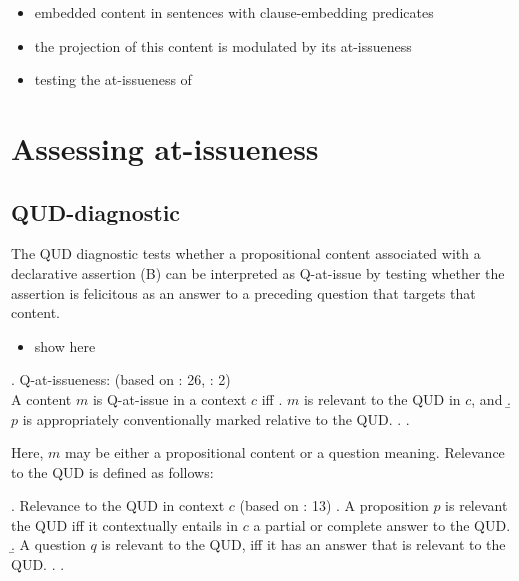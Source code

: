     \begin{itemize}
      \item embedded content in sentences with clause-embedding predicates 
      \item the projection of this content is modulated by its at-issueness
      \item testing the at-issueness of 

    \end{itemize}


   

\section{Assessing at-issueness}
  \subsection{QUD-diagnostic}
    The QUD diagnostic tests whether a propositional content associated with a declarative assertion (B) can be interpreted as Q-at-issue by testing whether the assertion is felicitous as an answer to a preceding question that targets that content.
    \begin{itemize}
      \item show here
    \end{itemize}

    \ex. \label{def:qai}%
      Q-at-issueness: \hfill (based on \citealt{simons_what_2010}: 26, \citealt{koev_notions_2018}: 2)\\
        A content $m$ is Q-at-issue in a context $c$ iff
        \a. \label{def:qai-relevant}%
          $m$ is relevant to the QUD in $c$, and
        \b.  \label{def:qai-conventional}%
          $p$ is appropriately conventionally marked relative to the QUD.
        \z. 
      \z.

      Here, $m$ may be either a propositional content or a question meaning. Relevance to the QUD is defined as follows:

      \ex. Relevance to the QUD in context $c$ \hfill (based on \citealt{simons_what_2010}: 13)
        \a. A proposition $p$ is relevant the QUD iff it contextually entails in $c$ a partial or complete answer to the QUD.
        \b. A question $q$ is relevant to the QUD, iff it has an answer that is relevant to the QUD.
        \z.
      \z.

